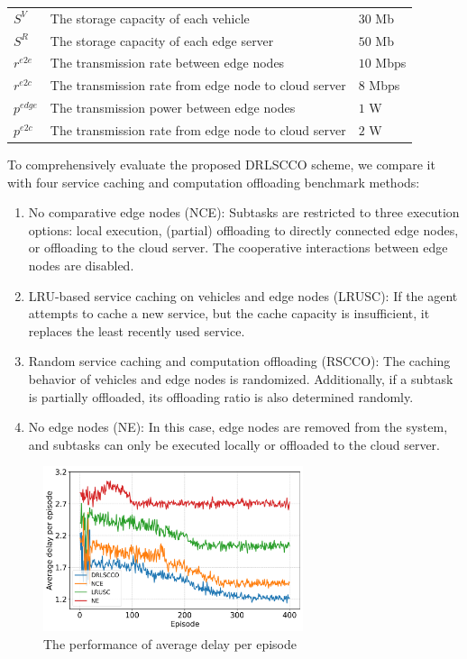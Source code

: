 \documentclass[lettersize,journal]{IEEEtran}
\begin{document}
\begin{table}
\begin{center}
\begin{tabularx}{\linewidth}{X p{4.7cm} X}
			$ S^{V} $			& The storage capacity of each vehicle			&$ 30 $ Mb 			\\
			$ S^{R} $			& The storage capacity of each edge server		&$ 50 $ Mb 			\\
		$ r^{e2e} $			& The transmission rate between edge nodes				&$ 10 $ Mbps \\
		$ r^{e2c} $			& The transmission rate from edge node to cloud server	&$ 8 $  Mbps \\
		$ p^{edge} $			& The transmission power  between edge nodes			&$ 1 $ W 	\\
		$ p^{e2c} $			& The transmission rate from edge node to cloud server  &$ 2$  W 	\\
		\hline
		\end{tabularx}
	\end{center}
\end{table}


To comprehensively evaluate the proposed DRLSCCO scheme, we compare it with four service caching and computation offloading benchmark methods:
\begin{enumerate}
	\item 
	No comparative edge nodes (NCE): Subtasks are restricted to three execution options: local execution, (partial) offloading to directly connected edge nodes, or offloading to the cloud server. The cooperative interactions between edge nodes are disabled.
	\item
	LRU-based service caching on vehicles and edge nodes (LRUSC): If the agent attempts to cache a new service, but the cache capacity is insufficient, it replaces the least recently used service.
	\item 
	Random service caching and computation offloading (RSCCO): The caching behavior of vehicles and edge nodes is randomized. Additionally, if a subtask is partially offloaded, its offloading ratio is also determined randomly.
	\item
	No edge nodes (NE): In this case, edge nodes are removed from the system, and subtasks can only be executed locally or offloaded to the cloud server.
\end{enumerate}


\begin{figure}
	\centering
	\includegraphics[width=3in]{convergence_delay.png}
	\caption{The performance of average delay per episode}
	\label{fig: convergence 1}
\end{figure}
\end{document}
